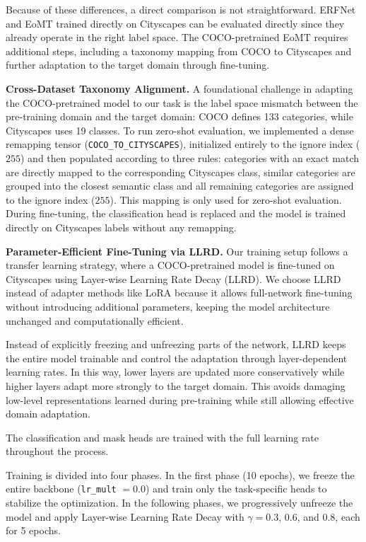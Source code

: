 \documentclass[10pt,twocolumn,letterpaper]{article}
\begin{document}
Because of these differences, a direct comparison is not straightforward. ERFNet and EoMT trained directly on Cityscapes can be evaluated directly since they already operate in the right label space. The COCO-pretrained EoMT requires additional steps, including a taxonomy mapping from COCO to Cityscapes and further adaptation to the target domain through fine-tuning.

\textbf{Cross-Dataset Taxonomy Alignment.}
A foundational challenge in adapting the COCO-pretrained model to our task is the label space mismatch between the pre-training domain and the target domain: COCO defines 133 categories, while Cityscapes uses 19 classes. To run zero-shot evaluation, we implemented a dense remapping tensor (\texttt{COCO\_TO\_CITYSCAPES}), initialized entirely to the ignore index ($255$) and then populated according to three rules: categories with an exact match are directly mapped to the corresponding Cityscapes class, similar categories are grouped into the closest semantic class and all remaining categories are assigned to the ignore index ($255$).
This mapping is only used for zero-shot evaluation. During fine-tuning, the classification head is replaced and the model is trained directly on Cityscapes labels without any remapping.

\textbf{Parameter-Efficient Fine-Tuning via LLRD.}
Our training setup follows a transfer learning strategy, where a COCO-pretrained model is fine-tuned on Cityscapes using Layer-wise Learning Rate Decay (LLRD). We choose LLRD instead of adapter methods like LoRA because it allows full-network fine-tuning without introducing additional parameters, keeping the model architecture unchanged and computationally efficient.

Instead of explicitly freezing and unfreezing parts of the network, LLRD keeps the entire model trainable and control the adaptation through layer-dependent learning rates. In this way, lower layers are updated more conservatively while higher layers adapt more strongly to the target domain. This avoids damaging low-level representations learned during pre-training while still allowing effective domain adaptation.

The classification and mask heads are trained with the full learning rate throughout the process.

Training is divided into four phases. In the first phase (10 epochs), we freeze the entire backbone (\texttt{lr\_mult} $= 0.0$) and train only the task-specific heads to stabilize the optimization. In the following phases, we progressively unfreeze the model and apply Layer-wise Learning Rate Decay with $\gamma = 0.3$, $0.6$, and $0.8$, each for 5 epochs.
\end{document}
